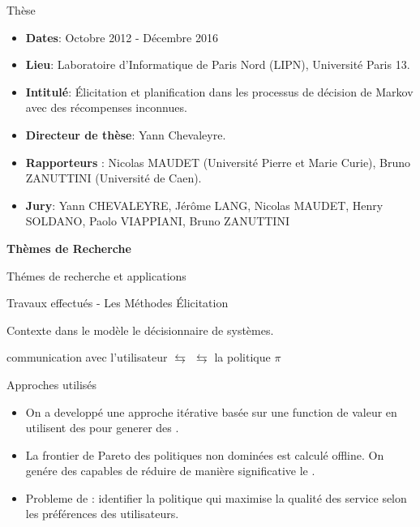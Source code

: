 \documentclass{beamer}
\newcommand{\imp}[1]{{\color{red}{#1}}}
\begin{document}
{\begin{frame}{Thèse}
\begin{itemize} 
\item \textbf{Dates}: Octobre 2012 - Décembre 2016
\item \textbf{Lieu}: Laboratoire d’Informatique de Paris Nord (LIPN),
Université Paris 13.
\item \textbf{Intitulé}: Élicitation et planification dans les processus de
décision de Markov avec des récompenses inconnues.
\item \textbf{Directeur de thèse}: Yann Chevaleyre.
\item \textbf{Rapporteurs} : Nicolas MAUDET (Université Pierre et
Marie Curie), Bruno ZANUTTINI (Université de Caen).
\item \textbf{Jury}: Yann CHEVALEYRE, Jérôme LANG, Nicolas
MAUDET, Henry SOLDANO, Paolo VIAPPIANI, Bruno
ZANUTTINI
\end{itemize}
	
\end{frame}

\begin{frame}
	\begin{center}
	\textbf{Thèmes de Recherche}
	\end{center}
\end{frame}
{


\begin{frame}{Thémes de recherche et applications}

\end{frame}

\begin{frame}{Travaux effectués - Les Méthodes Élicitation}
\begin{block}{Contexte}
\imp{Prédire des informations incertains} dans le modèle \imp{en interrogeant} le décisionnaire de systèmes.
\begin{center}
communication avec l’utilisateur $\leftrightarrows$  $\leftrightarrows$ la politique $\pi$
\end{center}
\end{block}


\begin{block}{Approches utilisés}
\begin{itemize}
\item On a developpé une approche itérative basée sur une function de valeur en utilisent des \imp{méthodes de clustering} pour generer des \imp{requ\^etes plus informatives}.
\item La frontier de Pareto des politiques non dominées est calculé offline. On genére des \imp{coupes}capables de réduire de manière significative le \imp{polytope des recompenses}.
\item Probleme de \imp{composition de \textit{web-service}}: identifier la politique qui maximise la qualité des service selon les préférences des utilisateurs.
\end{itemize}
\end{block}


\end{frame}}}
\end{document}
